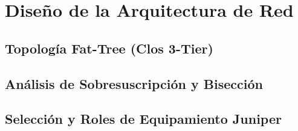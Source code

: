 \section{Diseño de la Arquitectura de Red}
\label{sec:arquitectura_red}

\subsection{Topología Fat-Tree (Clos 3-Tier)}
\label{subsec:topologia_fattree}

\subsection{Análisis de Sobresuscripción y Bisección}
\label{subsec:sobresuscripcion}

\subsection{Selección y Roles de Equipamiento Juniper}
\label{subsec:roles_equipamiento}
